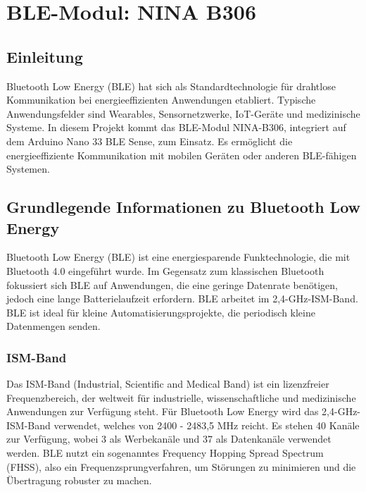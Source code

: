 %
%
%

\chapter{BLE-Modul: NINA B306}\label{Nina}

\section{Einleitung}
Bluetooth Low Energy (BLE) hat sich als Standardtechnologie für drahtlose Kommunikation bei energieeffizienten Anwendungen etabliert. Typische Anwendungsfelder sind Wearables, Sensornetzwerke, IoT-Geräte und medizinische Systeme. In diesem Projekt kommt das BLE-Modul NINA-B306, integriert auf dem Arduino Nano 33 BLE Sense, zum Einsatz. Es ermöglicht die energieeffiziente Kommunikation mit mobilen Geräten oder anderen BLE-fähigen Systemen. \cite{Tosi:2017} \cite{UBLOX:2023}

\section{Grundlegende Informationen zu Bluetooth Low Energy}
Bluetooth Low Energy (BLE) ist eine energiesparende Funktechnologie, die mit Bluetooth 4.0 eingeführt wurde. Im Gegensatz zum klassischen Bluetooth fokussiert sich BLE auf Anwendungen, die eine geringe Datenrate benötigen, jedoch eine lange Batterielaufzeit erfordern. BLE arbeitet im 2,4-GHz-ISM-Band. BLE ist ideal für kleine Automatisierungsprojekte, die periodisch kleine Datenmengen senden.\cite{Tosi:2017} \cite{UBLOX:2023}
\subsection{ISM-Band}
Das ISM-Band (Industrial, Scientific and Medical Band) ist ein lizenzfreier Frequenzbereich, der weltweit für industrielle, wissenschaftliche und medizinische Anwendungen zur Verfügung steht. Für Bluetooth Low Energy wird das 2,4-GHz-ISM-Band verwendet, welches von 2400 - 2483,5 MHz reicht. Es stehen 40 Kanäle zur Verfügung, wobei 3 als Werbekanäle und 37 als Datenkanäle verwendet werden. BLE nutzt ein sogenanntes Frequency Hopping Spread Spectrum (FHSS), also ein Frequenzsprungverfahren, um Störungen zu minimieren und die Übertragung robuster zu machen.

